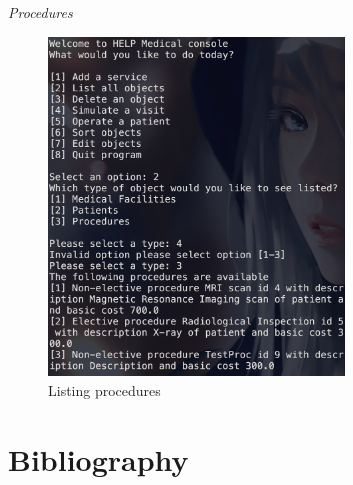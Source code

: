 \documentclass{article}
\begin{document}
	\textit{Procedures}
	\begin{figure}
		\begin{center}
			\includegraphics[width=0.7\textwidth]{figures/Listing/Listing_Procedures.png}
		\end{center}
		\caption{Listing procedures}\label{fig:listing_procedures}
	\end{figure}

	

	\section{Bibliography}\label{sec:bibliography} %
	\printbibliography
\end{document}
